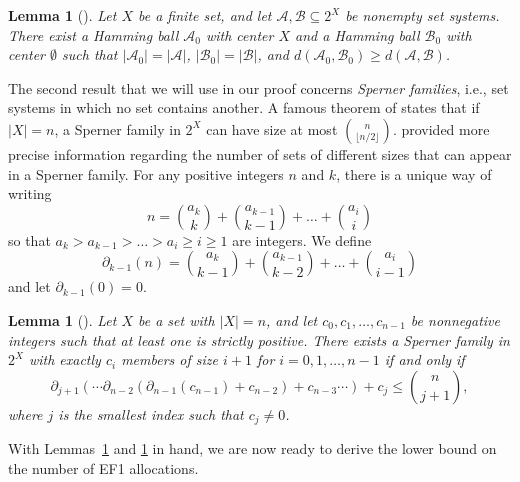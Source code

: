 \documentclass[11pt]{scrartcl}
\newtheorem{lemma}[theorem]{Lemma}
\theoremstyle{definition}
\begin{document}
\begin{lemma}[\cite{Bollobas86,Calabro04}]
\label{lem:hamming}
Let $X$ be a finite set, and let $\mathcal{A},\mathcal{B}\subseteq 2^X$ be nonempty set systems. 
There exist a Hamming ball $\mathcal{A}_0$ with center $X$ and a Hamming ball $\mathcal{B}_0$ with center $\emptyset$ such that $|\mathcal{A}_0|=|\mathcal{A}|$, $|\mathcal{B}_0|=|\mathcal{B}|$, and $d(\mathcal{A}_0,\mathcal{B}_0)\geq d(\mathcal{A},\mathcal{B})$.
\end{lemma}

The second result that we will use in our proof concerns \emph{Sperner families}, i.e., set systems in which no set contains another.
A famous theorem of \cite{Sperner28} states that if $|X|=n$, a Sperner family in $2^X$ can have size at most $\binom{n}{\lfloor n/2\rfloor}$.
\citet[Thm.~2.2]{Bjorner86} provided more precise information regarding the number of sets of different sizes that can appear in a Sperner family.
For any positive integers $n$ and $k$, there is a unique way of writing
$$
n = \binom{a_k}{k} + \binom{a_{k-1}}{k-1}+\dots+\binom{a_i}{i}
$$
so that $a_k>a_{k-1}>\dots>a_i\geq i\geq 1$ are integers. 
We define
$$
\partial_{k-1}(n) = \binom{a_k}{k-1} + \binom{a_{k-1}}{k-2}+\dots+\binom{a_i}{i-1}
$$
and let $\partial_{k-1}(0) = 0$.

\begin{lemma}[\cite{Bjorner86}]
\label{lem:sperner}
Let $X$ be a set with $|X|=n$, and let $c_0,c_1,\dots,c_{n-1}$ be nonnegative integers such that at least one is strictly positive.
There exists a Sperner family in $2^X$ with exactly $c_i$ members of size $i+1$ for $i=0,1,\dots,n-1$ if and only if
$$
\partial_{j+1}(\cdots\partial_{n-2}(\partial_{n-1}(c_{n-1})+c_{n-2})+c_{n-3}\cdots)+c_j \leq \binom{n}{j+1},
$$
where $j$ is the smallest index such that $c_j \neq 0$.
\end{lemma}

With Lemmas~\ref{lem:hamming} and \ref{lem:sperner} in hand, we are now ready to derive the lower bound on the number of EF1 allocations.
\end{document}
